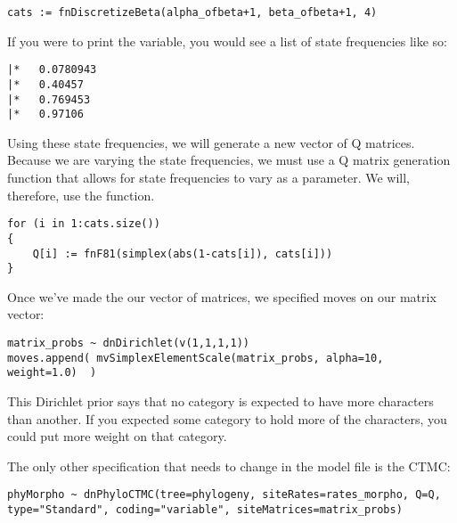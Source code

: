 {\tt \begin{snugshade*}
\begin{lstlisting}
cats := fnDiscretizeBeta(alpha_ofbeta+1, beta_ofbeta+1, 4)
\end{lstlisting}
\end{snugshade*}}

If you were to print the  variable, you would see a list of state frequencies like so:

{\tiny{\tt \begin{snugshade*}
\begin{lstlisting}
|*   0.0780943
|*   0.40457
|*   0.769453
|*   0.97106
\end{lstlisting}
\end{snugshade*}}}

Using these state frequencies, we will generate a new vector of Q matrices.
Because we are varying the state frequencies, we must use a Q matrix generation function that allows for state frequencies to vary as a parameter.
We will, therefore, use the  function.

{\tt \begin{snugshade*}
\begin{lstlisting}
for (i in 1:cats.size())
{
    Q[i] := fnF81(simplex(abs(1-cats[i]), cats[i]))
}
\end{lstlisting}
\end{snugshade*}}

Once we've made the our vector of matrices, we specified moves on our matrix vector:
{\tt \begin{snugshade*}
\begin{lstlisting}
matrix_probs ~ dnDirichlet(v(1,1,1,1))
moves.append( mvSimplexElementScale(matrix_probs, alpha=10, weight=1.0)  )
\end{lstlisting}
\end{snugshade*}}

This Dirichlet prior says that no category is expected to have more characters than another. If you expected some category to hold more of the characters, you could put more weight on that category. \par

The only other specification that needs to change in the model file is the CTMC:
{\tt \begin{snugshade*}
\begin{lstlisting}
phyMorpho ~ dnPhyloCTMC(tree=phylogeny, siteRates=rates_morpho, Q=Q, type="Standard", coding="variable", siteMatrices=matrix_probs)
\end{lstlisting}
\end{snugshade*}}

